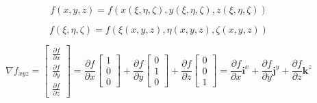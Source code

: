 \documentclass
[
a4paper,                      %
twoside,					  %
12pt,                         %
abstract,		      %
fleqn,                        %
]
{scrartcl} %
\begin{document}
\begin{equation}
f\left(x,y,z\right)=f\left(x\left(\xi,\eta,\zeta\right),y\left(\xi,\eta,\zeta\right),z\left(\xi,\eta,\zeta\right)\right)
\end{equation}

\begin{equation}
f\left(\xi,\eta,\zeta\right)=f\left(\xi\left(x,y,z\right),\eta\left(x,y,z\right),\zeta\left(x,y,z\right)\right)
\end{equation}

\begin{equation}
\nabla f_{xyz}=\begin{bmatrix}
\frac{\partial f}{\partial x}\\[5pt]
\frac{\partial f}{\partial y}\\[5pt]
\frac{\partial f}{\partial z}
\end{bmatrix}=\frac{\partial f}{\partial x}\begin{bmatrix}
1\\[5pt]
0\\[5pt]
0
\end{bmatrix}+\frac{\partial f}{\partial y}\begin{bmatrix}
0\\[5pt]
1\\[5pt]
0
\end{bmatrix}+\frac{\partial f}{\partial z}\begin{bmatrix}
0\\[5pt]
0\\[5pt]
1
\end{bmatrix}=\frac{\partial f}{\partial x}\mathbf{i}^{x}+\frac{\partial f}{\partial y}\mathbf{j}^{y}+\frac{\partial f}{\partial z}\mathbf{k}^{z}
\end{equation}
\end{document}
